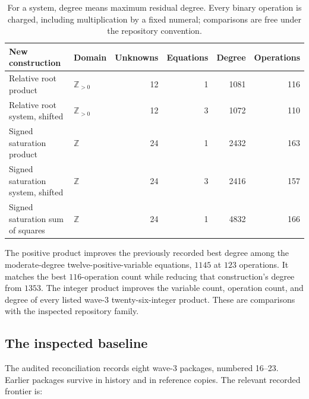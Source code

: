 \documentclass[11pt]{article}
\theoremstyle{remark}\newtheorem{remark}[theorem]{Remark}
\newcommand{\Z}{\mathbb Z}
\begin{document}
\begin{table}[ht]
\centering\small
\begin{tabular}{llrrrr}
\toprule
New construction & Domain & Unknowns & Equations & Degree & Operations\\
\midrule
Relative root product & \(\Z_{>0}\) & 12 & 1 & 1081 & 116\\
Relative root system, shifted & \(\Z_{>0}\) & 12 & 3 & 1072 & 110\\
Signed saturation product & \(\Z\) & 24 & 1 & 2432 & 163\\
Signed saturation system, shifted & \(\Z\) & 24 & 3 & 2416 & 157\\
Signed saturation sum of squares & \(\Z\) & 24 & 1 & 4832 & 166\\
\bottomrule
\end{tabular}
\caption{For a system, degree means maximum residual degree.
Every binary operation is charged, including multiplication by a fixed
numeral; comparisons are free under the repository convention.}
\label{tab:new}
\end{table}

The positive product improves the previously recorded best degree among
the moderate-degree twelve-positive-variable equations, \(1145\) at
\(123\) operations. It matches the best \(116\)-operation count while
reducing that construction's degree from \(1353\).
The integer product improves the variable count, operation count,
and degree of every listed wave-3 twenty-six-integer product.
These are comparisons with the inspected repository family.

\subsection{The inspected baseline}

The audited reconciliation \cite{catalogue} records eight wave-3 packages,
numbered 16--23. Earlier packages survive in history and in reference
copies. The relevant recorded frontier is:
\end{document}
